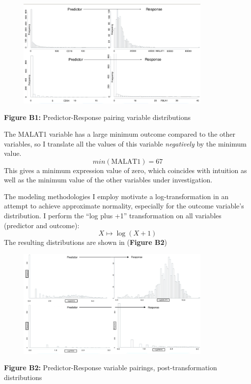 \documentclass[12pt,]{article}
\begin{document}
\begin{figure}[h!]
\centering
        \includegraphics[width=0.85\textwidth]{Untranslated.jpg}
\end{figure}

\vspace{5pt}

\begin{center}
\textbf{Figure B1:} Predictor-Response pairing variable distributions
\end{center}

The MALAT1 variable has a large minimum outcome compared to the other
variables, so I translate all the values of this variable
\textit{negatively} by the minimum value. \[min(\text{MALAT1})=67\] This
gives a minimum expression value of zero, which coincides with intuition
as well as the minimum value of the other variables under investigation.

The modeling methodologies I employ motivate a log-transformation in an
attempt to achieve approximate normality, especially for the outcome
variable's distribution. I perform the ``log plus +1'' transformation on
all variables (predictor and outcome):
\[X \mapsto \log \left(X+1\right) \] The resulting distributions are
shown in (\textbf{Figure B2})

\begin{figure}[h!]
\centering
        \includegraphics[width=0.85\textwidth]{Transformed.jpg}
\end{figure}
\vspace{5pt}
\begin{center}
\textbf{Figure B2:} Predictor-Response variable pairings, post-transformation distributions
\end{center}
\end{document}
